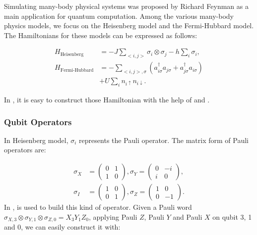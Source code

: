 Simulating many-body physical systems was proposed by Richard Feynman as a main application for quantum computation. Among the various many-body physics models, we focus on the Heisenberg model and the Fermi-Hubbard model. The Hamiltonians for these models can be expressed as follows:

\begin{align*}
    H_\text{Heisenberg}    & = -J\sum_{<i,j>}\sigma_i\otimes \sigma_j-h\sum_i\sigma_i,                                            \\
    H_\text{Fermi-Hubbard} & = -\sum_{<i,j>,\sigma}\left(a_{i\sigma}^\dagger a_{j\sigma} + a_{j\sigma}^\dagger a_{i\sigma}\right) \\
                           & + U\sum_i n_{i\uparrow}n_{i\downarrow}.
\end{align*}

In \MindQuantum, it is easy to construct those Hamiltonian with the help of \QubitOperator and \FermionOperator.

\subsubsection{Qubit Operators}

In Heisenberg model, $\sigma_i$ represents the Pauli operator. The matrix form of Pauli operators are:

\begin{align*}
    \sigma_X & = \begin{pmatrix}
        0 & 1 \\
        1 & 0
    \end{pmatrix}, \sigma_Y = \begin{pmatrix}
        0 & -i \\
        i & 0
    \end{pmatrix}, \\
    \sigma_I & =\begin{pmatrix}
        1 & 0 \\
        0 & 1
    \end{pmatrix}, \sigma_Z = \begin{pmatrix}
        1 & 0  \\
        0 & -1
    \end{pmatrix}.
\end{align*}
In \MindQuantum, \QubitOperator is used to build this kind of operator. Given a Pauli word $\sigma_{X,3}\otimes \sigma_{Y,1}\otimes \sigma_{Z,0}=X_3 Y_1 Z_0$, applying Pauli $Z$, Pauli $Y$ and Pauli $X$ on qubit 3, 1 and 0,  we can easily construct it with:

